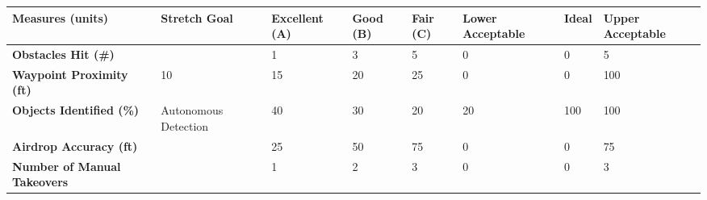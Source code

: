 \begin{table}[H]
	\centering
\begin{tabular}{|p{4.2cm}|p{2.1cm}|p{1.7cm}|p{1cm}|p{1cm}|p{1.7cm}|p{1cm}|p{1.7cm}|}
	\hline
\rowcolor[HTML]{C0C0C0}	
	{\color[HTML]{000000} \textbf{Measures (units)}} & {\color[HTML]{000000}\textbf{Stretch Goal}} & {\color[HTML]{000000}\textbf{Excellent (A)}} & {\color[HTML]{000000}\textbf{Good (B)}} & {\color[HTML]{000000}\textbf{Fair (C)}} & {\color[HTML]{000000}\textbf{Lower Acceptable}} & {\color[HTML]{000000}\textbf{Ideal}} & {\color[HTML]{000000}\textbf{Upper Acceptable}} \\
	\hline
	\textbf{Obstacles Hit (\#)} & & 1 & 3 & 5 & 0 & 0 & 5 \\
	\hline
	\textbf{Waypoint Proximity (ft)} & 10 & 15 & 20 & 25 & 0 & 0 & 100 \\
	\hline
	\textbf{Objects Identified (\%)} & Autonomous Detection & 40 & 30 & 20 & 20 & 100 & 100 \\
	\hline
	\textbf{Airdrop Accuracy (ft)} & & 25 & 50 & 75 & 0 & 0 & 75 \\
	\hline
	\textbf{Number of Manual Takeovers} & & 1 & 2 & 3 & 0 & 0 & 3 \\
	\hline
\end{tabular}
\end{table}

